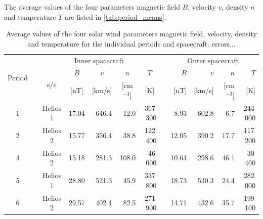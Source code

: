 The average values of the four parameters magnetic field $B$, velocity $v$, density $n$ and temperature $T$ are listed in \autoref{tab:period_means}.
\begin{table}[htb]\small
	\centering
	\captionsetup{belowskip=4pt}
	\caption{Average values of the four solar wind parameters magnetic field, velocity, density and temperature for the individual periods and spacecraft. errors...}
	\begin{tabular}{cccrrrrcrrrr}
		\toprule
		\multirow{3}{*}{Period}	&	&\multicolumn{5}{c}{Inner spacecraft}	&	&\multicolumn{4}{c}{Outer spacecraft}\\
		\cmidrule{3-7}	\cmidrule{9-12}
			&	&\multirow{2}{*}{s/c}	&\multicolumn{1}{c}{$B$}	&\multicolumn{1}{c}{$v$}	&\multicolumn{1}{c}{$n$}	&\multicolumn{1}{c}{$T$}	&	&$B$	&$v$	&$n$	&$T$\\
			&	&	&\multicolumn{1}{c}{[nT]}	&\multicolumn{1}{c}{[km/s]}	&\multicolumn{1}{c}{[cm$^{-3}$]}	&\multicolumn{1}{c}{[K]}	&	&[nT]	&[km/s]	&[cm$^{-3}$]	&[K]\\
		\midrule
		1	&	&Helios 1	&17.04	&646.4	&12.0	&367\,300	&	&8.93	&602.8	&6.7	&244\,000\\
		2	&	&Helios 2	&15.77	&356.4	&38.8	&122\,400	&	&12.05	&390.2	&17.7	&117\,200\\
		4	&	&Helios 2	&15.18	&281.3	&108.0	&46\,000	&	&10.64	&298.6	&46.1	&30\,400\\
		5	&	&Helios 1	&28.80	&521.3	&45.9	&337\,800	&	&18.73	&530.3	&24.4	&282\,000\\
		6	&	&Helios 2	&29.57	&402.4	&82.5	&271\,900	&	&14.71	&432.6	&35.7	&199\,100\\
		\bottomrule
	\end{tabular}
	\label{tab:period_means}
\end{table}

